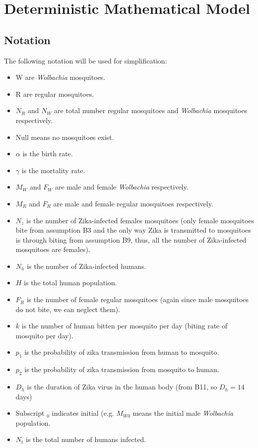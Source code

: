 \documentclass{article}
\begin{document}
\section{Deterministic Mathematical Model}
\subsection{Notation}
The following notation will be used for simplification:
\begin{itemize}
    \item W are \textit{Wolbachia} mosquitoes.
    \item R are regular mosquitoes.
    \item $N_R$ and $N_W$ are total number regular mosquitoes and \textit{Wolbachia} mosquitoes respectively.
    \item Null means no mosquitoes exist.
    \item $\alpha$ is the birth rate.
    \item $\gamma$ is the mortality rate.
    \item $M_W$ and $F_W$ are male and female \textit{Wolbachia} respectively.
    \item $M_R$ and $F_R$ are male and female regular mosquitoes respectively.
    \item $N_z$ is the number of Zika-infected females mosquitoes (only female mosquitoes bite from assumption B3 and the only way Zika is transmitted to mosquitoes is through biting from assumption B9, thus, all the number of Zika-infected mosquitoes are females).
    \item $N_h$ is the number of Zika-infected humans.
    \item $H$ is the total human population.
    \item $F_R$ is the number of female regular mosquitoes (again since male mosquitoes do not bite, we can neglect them).
    \item $k$ is the number of human bitten per mosquito per day (biting rate of mosquito per day).
    \item $p_1$ is the probability of zika transmission from human to mosquito.
    \item $p_2$ is the probability of zika transmission from mosquito to human.
    \item $D_h$ is the duration of Zika virus in the human body (from B11, so $D_h=14$ days)
    \item Subscript $_0$ indicates initial (e.g. $M_{W0}$ means the initial male \textit{Wolbachia}
    population.
    \item $N_t$ is the total number of humans infected.
 \end{itemize}
\end{document}
